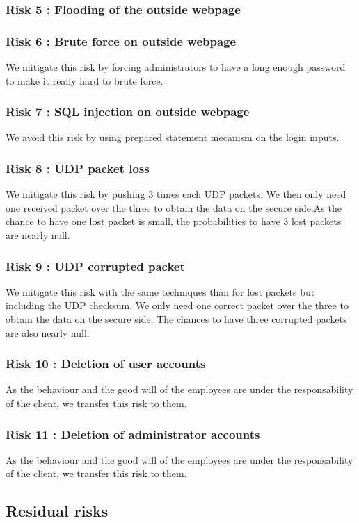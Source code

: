 \documentclass[a4paper,11pt]{article}
\begin{document}
\subsubsection{Risk 5 : Flooding of the outside webpage}

\subsubsection{Risk 6 : Brute force on outside webpage}
We mitigate this risk by forcing administrators to have a long enough password to make it really hard to brute force.
\subsubsection{Risk 7 : SQL injection on outside webpage}
We avoid this risk by using prepared statement mecanism on the login inputs.
\subsubsection{Risk 8 : UDP packet loss}
We mitigate this risk by pushing 3 times each UDP packets. We then only need one received packet over the three to obtain the data on the secure side.As the chance to have one lost packet is small, the probabilities to have 3 lost packets are nearly null.
\subsubsection{Risk 9 : UDP corrupted packet}
We mitigate this risk with the same techniques than for lost packets but including the UDP checksum. We only need one correct packet over the three to obtain the data on the secure side. The chances to have three corrupted packets are also nearly null.
\subsubsection{Risk 10 : Deletion of user accounts}
As the behaviour and the good will of the employees are under the responsability of the client, we transfer this risk to them.
\subsubsection{Risk 11 : Deletion of administrator accounts}
As the behaviour and the good will of the employees are under the responsability of the client, we transfer this risk to them.
\subsection{Residual risks}
\end{document}
